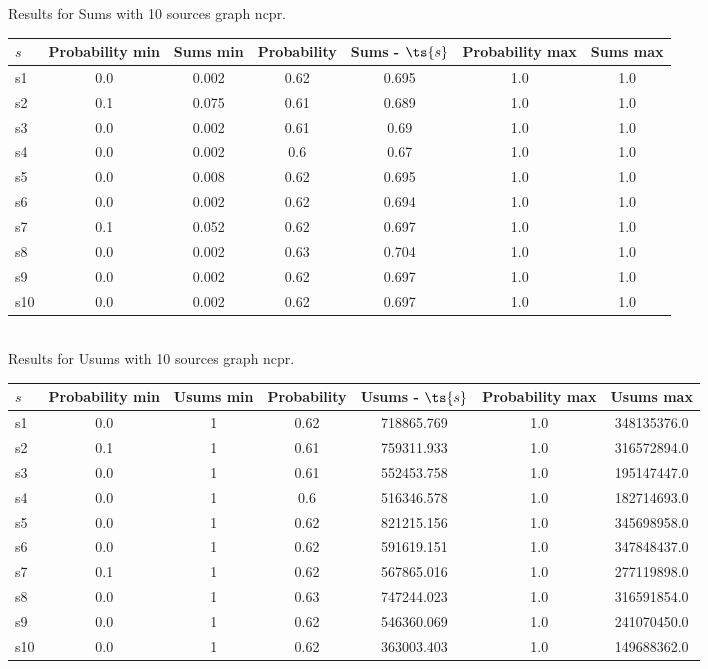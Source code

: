\documentclass{article}
\begin{document}
\noindent Results for Sums with 10 sources graph ncpr.

\noindent\begin{tabular}{|l|c|c|c|c|c|c|}
\hline
$s$& Probability min & Sums min & Probability & Sums - $\ts{s}$ & Probability max & Sums max\\
\hline
s1 &0.0 & 0.002 & 0.62 & 0.695 & 1.0 & 1.0\\
\hline
s2 &0.1 & 0.075 & 0.61 & 0.689 & 1.0 & 1.0\\
\hline
s3 &0.0 & 0.002 & 0.61 & 0.69 & 1.0 & 1.0\\
\hline
s4 &0.0 & 0.002 & 0.6 & 0.67 & 1.0 & 1.0\\
\hline
s5 &0.0 & 0.008 & 0.62 & 0.695 & 1.0 & 1.0\\
\hline
s6 &0.0 & 0.002 & 0.62 & 0.694 & 1.0 & 1.0\\
\hline
s7 &0.1 & 0.052 & 0.62 & 0.697 & 1.0 & 1.0\\
\hline
s8 &0.0 & 0.002 & 0.63 & 0.704 & 1.0 & 1.0\\
\hline
s9 &0.0 & 0.002 & 0.62 & 0.697 & 1.0 & 1.0\\
\hline
s10 &0.0 & 0.002 & 0.62 & 0.697 & 1.0 & 1.0\\
\hline
\end{tabular}\\

\noindent Results for Usums with 10 sources graph ncpr.

\noindent\begin{tabular}{|l|c|c|c|c|c|c|}
\hline
$s$& Probability min & Usums min & Probability & Usums - $\ts{s}$ & Probability max & Usums max\\
\hline
s1 &0.0 & 1 & 0.62 & 718865.769 & 1.0 & 348135376.0\\
\hline
s2 &0.1 & 1 & 0.61 & 759311.933 & 1.0 & 316572894.0\\
\hline
s3 &0.0 & 1 & 0.61 & 552453.758 & 1.0 & 195147447.0\\
\hline
s4 &0.0 & 1 & 0.6 & 516346.578 & 1.0 & 182714693.0\\
\hline
s5 &0.0 & 1 & 0.62 & 821215.156 & 1.0 & 345698958.0\\
\hline
s6 &0.0 & 1 & 0.62 & 591619.151 & 1.0 & 347848437.0\\
\hline
s7 &0.1 & 1 & 0.62 & 567865.016 & 1.0 & 277119898.0\\
\hline
s8 &0.0 & 1 & 0.63 & 747244.023 & 1.0 & 316591854.0\\
\hline
s9 &0.0 & 1 & 0.62 & 546360.069 & 1.0 & 241070450.0\\
\hline
s10 &0.0 & 1 & 0.62 & 363003.403 & 1.0 & 149688362.0\\
\hline
\end{tabular}\\
\end{document}
